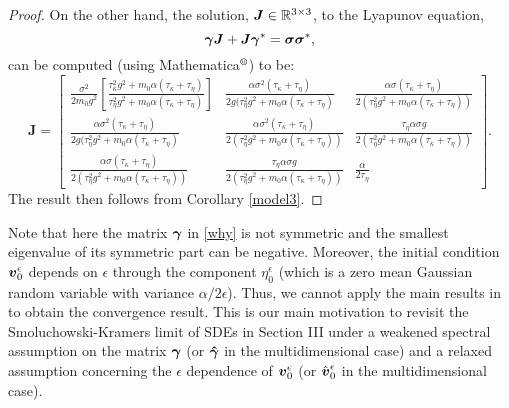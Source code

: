 \begin{proof}
On the other hand, the solution, $\boldsymbol{J} \in \mathbb{R}^{3 \times 3}$, to the Lyapunov equation, 
\begin{equation}
\boldsymbol{\gamma} \boldsymbol{J} + \boldsymbol{J} \boldsymbol{\gamma}^{*} = \boldsymbol{\sigma} \boldsymbol{\sigma}^{*},\end{equation}
can be computed (using Mathematica$\textsuperscript{\textregistered}$) to be:
\begin{equation}
\boldsymbol{J} =  \left[ \begin{array}{ccc}
\frac{ \sigma^2}{2m_{0} g^2}\left[ \frac{\tau_{\kappa}^2 g^2 + m_{0} \alpha (\tau_{\kappa}+\tau_{\eta}) }{\tau_{\eta}^2 g^2 + m_{0} \alpha (\tau_{\kappa}+\tau_{\eta})}\right] & \frac{\alpha \sigma^2(\tau_{\kappa}+\tau_{\eta}) }{2g(\tau_{\eta}^2 g^2+m_{0} \alpha(\tau_{\kappa}+\tau_{\eta})} 
& \frac{\alpha \sigma(\tau_{\kappa}+\tau_{\eta})}{2(\tau_{\eta}^2 g^2 + m_{0} \alpha(\tau_{\kappa}+\tau_{\eta}))} \\ 
\frac{\alpha \sigma^2(\tau_{\kappa}+\tau_{\eta}) }{2g(\tau_{\eta}^2 g^2+m_{0} \alpha(\tau_{\kappa}+\tau_{\eta})} 
& \frac{\alpha \sigma^2 (\tau_{\kappa}+\tau_{\eta})}{2(\tau_{\eta}^2 g^2 +m_{0} \alpha(\tau_{\kappa}+\tau_{\eta}))} & \frac{\tau_{\eta} \alpha \sigma g}{2  (\tau_{\eta}^2 g^2+ m_{0} \alpha(\tau_{\kappa}+\tau_{\eta}))} \\ 
 \frac{\alpha \sigma(\tau_{\kappa}+\tau_{\eta})}{2(\tau_{\eta}^2 g^2 + m_{0} \alpha(\tau_{\kappa}+\tau_{\eta}))}
 &  \frac{\tau_{\eta} \alpha \sigma g}{2  (\tau_{\eta}^2 g^2 + m_{0} \alpha(\tau_{\kappa}+\tau_{\eta}))} & \frac{\alpha}{2 \tau_{\eta}}
 \end{array} \right].\end{equation} The result then follows from Corollary \ref{model3}. 
\end{proof}

\begin{remark} \label{imp_rmk}
Note that here the matrix $\boldsymbol{\gamma}$ in \eqref{why} is not symmetric and the smallest eigenvalue of its symmetric part can be negative. Moreover, the initial condition $\boldsymbol{v}^\epsilon_0$ depends on $\epsilon$ through the component $\eta^\epsilon_0$ (which is a zero mean Gaussian random variable with variance $\alpha/2\epsilon$). Thus, we cannot apply the main results in \cite{hottovy2015smoluchowski}  to obtain the convergence result. This is our main motivation to revisit the Smoluchowski-Kramers limit of SDEs in Section III under a weakened spectral assumption on the matrix $\boldsymbol{\gamma}$ (or $\boldsymbol{\hat{\gamma}}$ in the multidimensional case) and a relaxed assumption concerning the $\epsilon$ dependence of $\boldsymbol{v}^\epsilon_0$ (or $\hat{\boldsymbol{v}}^\epsilon_0$ in the multidimensional case).  
\end{remark}

